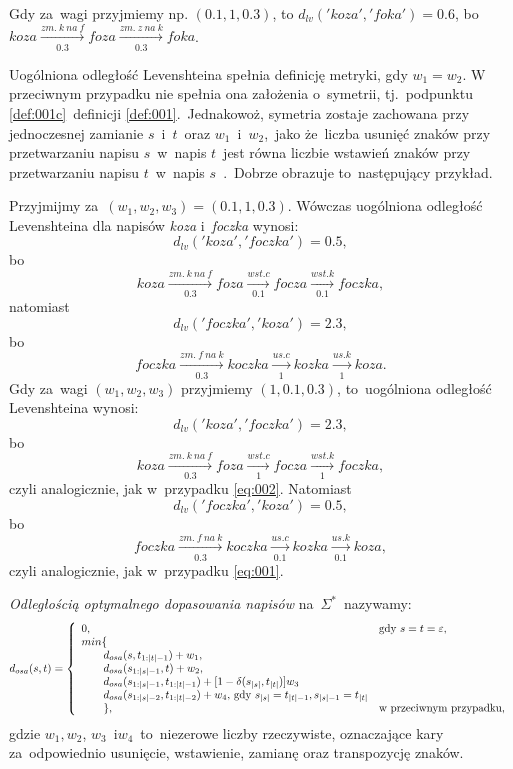 \documentclass{praca1}
\begin{document}
Gdy za~wagi przyjmiemy np. $(0.1, 1, 0.3)$, to $d_{lv}('koza', 'foka') = 0.6$, bo~$koza  \xrightarrow[0.3]{zm.\ k\ na\ f} foza  \xrightarrow[0.3]{zm.\ z\ na\ k} foka$.

Uogólniona odległość Levenshteina spełnia definicję metryki, gdy $w_1 = w_2$. W przeciwnym przypadku nie spełnia ona założenia o~symetrii, tj.~podpunktu \ref{def:001c}~definicji \ref{def:001}.~Jednakowoż, symetria zostaje zachowana przy jednoczesnej zamianie $s$~i~$t$~oraz $w_1$~i~$w_2$,~jako że~liczba usunięć znaków przy przetwarzaniu napisu $s$~w~napis $t$~jest równa liczbie wstawień znaków przy przetwarzaniu napisu $t$~w~napis $s$~\cite{Loo2014:stringdist}.~Dobrze obrazuje to~następujący przykład.

\begin{example}
Przyjmijmy za~$(w_1, w_2, w_3) = (0.1, 1, 0.3)$. Wówczas uogólniona odległość Levenshteina dla napisów \emph{koza} i~\emph{foczka} wynosi:
\begin{equation}
\label{eq:001}
d_{lv}('koza', 'foczka') = 0.5,
\end{equation}
bo
$$
koza  \xrightarrow[0.3]{zm.\ k\ na\ f} foza  \xrightarrow[0.1]{wst. c} focza \xrightarrow[0.1]{wst. k} foczka,
$$
natomiast
\begin{equation}\label{eq:002}
d_{lv}('foczka', 'koza') = 2.3,
\end{equation}
bo
$$
foczka  \xrightarrow[0.3]{zm.\ f\ na\ k} koczka  \xrightarrow[1]{us. c} kozka \xrightarrow[1]{us. k} koza.
$$
Gdy za~wagi $(w_1, w_2, w_3)$ przyjmiemy $(1, 0.1, 0.3)$, to~uogólniona odległość Levenshteina wynosi:
$$
d_{lv}('koza', 'foczka') = 2.3,
$$
bo
$$
koza  \xrightarrow[0.3]{zm.\ k\ na\ f} foza  \xrightarrow[1]{wst. c} focza \xrightarrow[1]{wst. k} foczka,
$$
czyli analogicznie, jak w~przypadku \ref{eq:002}. Natomiast
$$
d_{lv}('foczka', 'koza') = 0.5,
$$
bo
$$
foczka  \xrightarrow[0.3]{zm.\ f\ na\ k} koczka  \xrightarrow[0.1]{us. c} kozka \xrightarrow[0.1]{us. k} koza,
$$
czyli analogicznie, jak w~przypadku \ref{eq:001}.
\end{example}


\begin{definition}
\emph{Odległością optymalnego dopasowania napisów} na~$\Sigma^*$~nazywamy:
$$
d_{osa}(s, t) = \left\{
\begin{array}{l l}     
    0, & \text{gdy } s = t = \varepsilon,\\
    min\{ & \\
\qquad    d_{osa}(s, t_{1:|t|-1}) + w_1, & \\
\qquad    d_{osa}(s_{1:|s|-1}, t) + w_2, & \\
\qquad    d_{osa}(s_{1:|s|-1}, t_{1:|t|-1}) + [1-\delta(s_{|s|}, t_{|t|})]w_3 & \\
\qquad    d_{osa}(s_{1:|s|-2}, t_{1:|t|-2}) + w_4\text{, gdy } s_{|s|} = t_{|t|-1}, s_{|s|-1} = t_{|t|} & \\
\qquad    \}, & \text{w przeciwnym przypadku},
\end{array}\right.
$$
gdzie $w_1, w_2$, $w_3$~i$w_4$~to~niezerowe liczby rzeczywiste, oznaczające kary za~odpowiednio usunięcie, wstawienie, zamianę oraz transpozycję znaków.
\end{definition}
\end{document}
